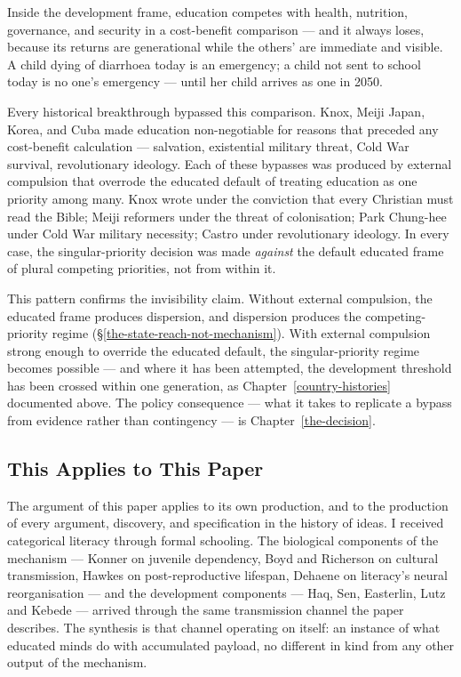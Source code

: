 \documentclass[12pt,letterpaper]{article}
\begin{document}
Inside the development frame, education competes with health,
nutrition, governance, and security in a cost-benefit comparison ---
and it always loses, because its returns are generational while the
others' are immediate and visible. A child dying of diarrhoea today is
an emergency; a child not sent to school today is no one's emergency
--- until her child arrives as one in 2050.

Every historical breakthrough bypassed this comparison. Knox, Meiji
Japan, Korea, and Cuba made education non-negotiable for reasons that
preceded any cost-benefit calculation --- salvation, existential
military threat, Cold War survival, revolutionary ideology. Each of
these bypasses was produced by external compulsion that overrode the
educated default of treating education as one priority among many.
Knox wrote under the conviction that every Christian must read the
Bible; Meiji reformers under the threat of colonisation; Park
Chung-hee under Cold War military necessity; Castro under
revolutionary ideology. In every case, the singular-priority decision
was made \emph{against} the default educated frame of plural
competing priorities, not from within it.

This pattern confirms the invisibility claim. Without external
compulsion, the educated frame produces dispersion, and dispersion
produces the competing-priority regime (\S\ref{the-state-reach-not-mechanism}).
With external compulsion strong enough to override the educated
default, the singular-priority regime becomes possible --- and where
it has been attempted, the development threshold has been crossed
within one generation, as Chapter~\ref{country-histories} documented above.
The policy consequence --- what it takes to replicate a bypass from
evidence rather than contingency --- is Chapter~\ref{the-decision}.

\subsection{This Applies to This Paper}\label{this-applies-to-this-paper}

The argument of this paper applies to its own production, and to the
production of every argument, discovery, and specification in the
history of ideas. I received categorical literacy through
formal schooling. The biological components of the mechanism --- Konner
on juvenile dependency, Boyd and Richerson on cultural transmission,
Hawkes on post-reproductive lifespan, Dehaene on literacy's neural
reorganisation --- and the development components --- Haq, Sen,
Easterlin, Lutz and Kebede --- arrived through the same transmission
channel the paper describes. The synthesis is that channel operating on
itself: an instance of what educated minds do with accumulated payload,
no different in kind from any other output of the mechanism.
\end{document}
